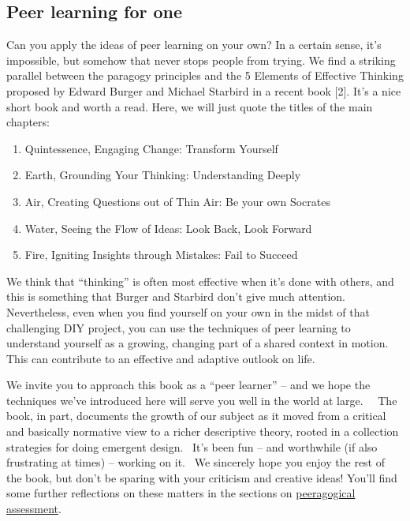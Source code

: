 \subsection{Peer learning for one}

Can you apply the ideas of peer learning on your own? In a certain
sense, it's impossible, but somehow that never stops people from trying.
We find a striking parallel between the paragogy principles and the 5
Elements of Effective Thinking proposed by Edward Burger and Michael
Starbird in a recent book {[}2{]}. It's a nice short book and worth a
read. Here, we will just quote the titles of the main chapters:

\begin{enumerate}
\itemsep1pt\parskip0pt
\item
  Quintessence, Engaging Change: Transform Yourself
\item
  Earth, Grounding Your Thinking: Understanding Deeply
\item
  Air, Creating Questions out of Thin Air: Be your own Socrates
\item
  Water, Seeing the Flow of Ideas: Look Back, Look Forward
\item
  Fire, Igniting Insights through Mistakes: Fail to Succeed
\end{enumerate}

We think that ``thinking'' is often most effective when it's done with
others, and this is something that Burger and Starbird don't give much
attention. Nevertheless, even when you find yourself on your own in the
midst of that challenging DIY project, you can use the techniques of
peer learning to understand yourself as a growing, changing part of a
shared context in motion. This can contribute to an effective and
adaptive outlook on life.

We invite you to approach this book as a ``peer learner'' -- and we hope
the techniques we've introduced here will serve you well in the world at
large.~~ The book, in part, documents the growth of our subject as it
moved from a critical and basically normative view to a richer
descriptive theory, rooted in a collection strategies for doing emergent
design.~ It's been fun -- and worthwhile (if also frustrating at times)
-- working on it.~ We sincerely hope you enjoy the rest of the book, but
don't be sparing with your criticism and creative ideas! You'll find
some further reflections on these matters in the sections on
\href{http://peeragogy.org/assessment/}{peeragogical assessment}.

